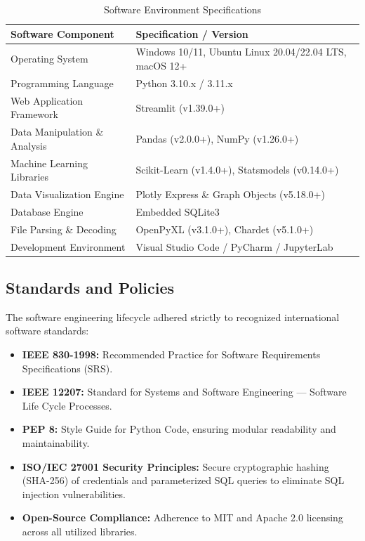 \documentclass[12pt,a4paper]{report}
\begin{document}
\begin{table}[h!]
\centering
\caption{Software Environment Specifications}
\label{tab:software}
\begin{tabular}{ll}
\toprule
\textbf{Software Component} & \textbf{Specification / Version} \\
\midrule
Operating System & Windows 10/11, Ubuntu Linux 20.04/22.04 LTS, macOS 12+ \\
Programming Language & Python 3.10.x / 3.11.x \\
Web Application Framework & Streamlit (v1.39.0+) \\
Data Manipulation \& Analysis & Pandas (v2.0.0+), NumPy (v1.26.0+) \\
Machine Learning Libraries & Scikit-Learn (v1.4.0+), Statsmodels (v0.14.0+) \\
Data Visualization Engine & Plotly Express \& Graph Objects (v5.18.0+) \\
Database Engine & Embedded SQLite3 \\
File Parsing \& Decoding & OpenPyXL (v3.1.0+), Chardet (v5.1.0+) \\
Development Environment & Visual Studio Code / PyCharm / JupyterLab \\
\bottomrule
\end{tabular}
\end{table}

\subsection{Standards and Policies}
The software engineering lifecycle adhered strictly to recognized international software standards:
\begin{itemize}
    \item \textbf{IEEE 830-1998:} Recommended Practice for Software Requirements Specifications (SRS).
    \item \textbf{IEEE 12207:} Standard for Systems and Software Engineering --- Software Life Cycle Processes.
    \item \textbf{PEP 8:} Style Guide for Python Code, ensuring modular readability and maintainability.
    \item \textbf{ISO/IEC 27001 Security Principles:} Secure cryptographic hashing (SHA-256) of credentials and parameterized SQL queries to eliminate SQL injection vulnerabilities.
    \item \textbf{Open-Source Compliance:} Adherence to MIT and Apache 2.0 licensing across all utilized libraries.
\end{itemize}
\end{document}
